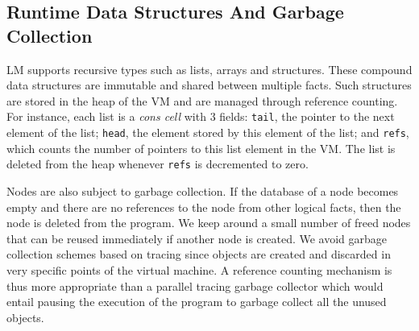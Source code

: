 \subsection{Runtime Data Structures And Garbage Collection}

LM supports recursive types such as lists, arrays and structures. These compound
data structures are immutable and shared between multiple facts. Such structures
are stored in the heap of the VM and are managed through reference counting. For
instance, each list is a \emph{cons cell} with 3 fields: \texttt{tail}, the
pointer to the next element of the list; \texttt{head}, the element stored by
this element of the list; and \texttt{refs}, which counts the number of pointers
to this list element in the VM. The list is deleted from the heap whenever
\texttt{refs} is decremented to zero.

Nodes are also subject to garbage collection. If the database of a node becomes
empty and there are no references to the node from other logical facts, then the
node is deleted from the program. We keep around a small number of freed nodes
that can be reused immediately if another node is created. We avoid garbage
collection schemes based on tracing since objects are created and discarded in
very specific points of the virtual machine. A reference counting mechanism is
thus more appropriate than a parallel tracing garbage collector which would
entail pausing the execution of the program to garbage collect all the unused
objects.
